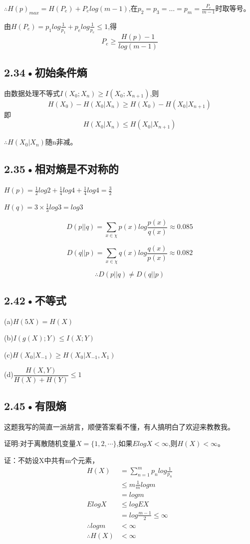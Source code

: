 \documentclass[UTF8]{ctexart}
\begin{document}
$\therefore H(p)_{max}=H(P_e)+ P_elog(m-1)$,在$p_2=p_3=\dots=p_m=\frac{P_e}{m-1}$时取等号。

由$H(P_e)= p_1log\frac{1}{p_1}+p_elog\frac{1}{p_e}\leqslant 1$,得$$P_e\geqslant \dfrac{H(p)-1}{log(m-1)}$$


\subsection*{2.34•初始条件熵}

由数据处理不等式$I(X_0;X_n)\geqslant I(X_0;X_{n+1})$,则$$H(X_0)-H(X_0|X_n)\geqslant H(X_0)-H(X_0|X_{n+1})$$即$$H(X_0|X_n)\leqslant H(X_0|X_{n+1}) $$

$\therefore H(X_0|X_n)$随n非减。


\subsection*{2.35•相对熵是不对称的}

$H(p)=\frac{1}{2}log2+\frac{1}{4}log4+\frac{1}{4}log4=\frac{3}{2}$

$H(q)=3\times\frac{1}{3}log3=log3$

$$D(p||q)=\sum _{x\in\chi}p(x)log\dfrac{p(x)}{q(x)}\approx 0.085$$

$$D(q||p)=\sum _{x\in\chi}q(x)log\dfrac{q(x)}{p(x)}\approx 0.082$$

$$\therefore D(p||q)\neq D(q||p) $$

\subsection*{2.42•不等式}

(a)$H(5X)=H(X)$

(b)$I(g(X);Y)\leqslant I(X;Y) $

(c)$H(X_0|X_{-1})\geqslant H(X_0|X_{-1},X_1) $

(d)$\dfrac{H(X,Y)}{H(X)+H(Y)} \leqslant 1$

\subsection*{2.45•有限熵}

这题我写的简直一派胡言，顺便答案看不懂，有人搞明白了欢迎来教教我。

证明:对于离散随机变量$X=\{1,2,\cdots\}$,如果$ElogX<\infty$,则$H(X)<\infty$。

证：不妨设X中共有m个元素，
\begin{equation*}
\begin{split}
H(X)&=\sum_{n=1}^m p_nlog\frac{1}{p_n}\\
&\leqslant m\frac{1}{m}logm\\
&=logm\\
ElogX&\leqslant logEX\\
&=log\frac{m-1}{2}\leqslant \infty\\
\therefore logm&<\infty\\
\therefore H(X)&<\infty
\end{split}
\end{equation*}
\end{document}
